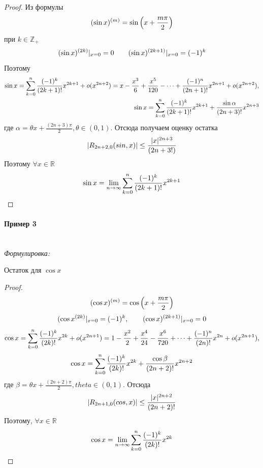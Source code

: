 \documentclass{article}
\let\vanillaparagraph\paragraph
\renewcommand{\paragraph}[1]{\vanillaparagraph{#1}\mbox{}\\}
\begin{document}
\begin{proof}
Из формулы 
\begin{equation}
(\sin{x})^{(m)} = \sin{\left(x + \frac{m\pi} {2}\right)}\notag
\end{equation}
при $k \in \mathbb{Z}_+$
\begin{equation}
(\sin{x})^{(2k)} \arrowvert_{x=0} = 0 \qquad (\sin{x})^{(2k + 1)} \arrowvert_{x=0} = (-1)^k\notag
\end{equation}
Поэтому 
\begin{eqnarray}
\sin{x} = \sum_{k=0}^n \frac{(-1)^k} {(2k+1)!} x^{2k+1} + o(x^{2n+2}) = x - \frac{x^3} {6} + \frac{x^5} {120} - \dots + \frac{(-1)^n} {(2n + 1)!} x^{2n+1} + o(x^{2n+2}),\notag \\
\sin{x} = \sum_{k=0}^n \frac{(-1)^k} {(2k+1)!} x^{2k+1} + \frac {\sin{\alpha}} {(2n+3)!} x^{2n+3}\notag
\end{eqnarray}
где $\alpha = \theta x + \frac{(2n + 3)\pi} {2}, \theta \in (0, 1)$.
Отсюда получаем оценку остатка
\begin{equation}
|R_{2n+2, 0} (sin, x )| \leq \frac{|x|^{2n + 3}} {(2n+3!)} \notag
\end{equation}
Поэтому $\forall x \in \mathbb{R}$
\begin{equation}
\sin{x} = \lim_{n\to\infty}\sum_{k=0}^n \frac{(-1)^k} {(2k+1)!} x^{2k+1}\notag
\end{equation}
\end{proof}

\paragraph{Пример 3}

\textit{Формулировка: }

Остаток для $\cos{x}$

\begin{proof}
\begin{equation}
(\cos{x})^{(m)} = \cos{\left(x + \frac{m\pi} {2}\right)}\notag
\end{equation}
\begin{equation}
(\cos{x}^{(2k)}\arrowvert_{x=0} = (-1)^k, \qquad (\cos{x})^{(2k + 1)} \arrowvert_{x=0} = 0\notag
\end{equation}
\begin{equation}
\cos{x} = \sum_{k=0}^n \frac{(-1)^k} {(2k)!} x^{2k} + o(x^{2n+1}) = 1 - \frac{x^2} {2} + \frac {x^4} {24} - \frac{x^6} {720} + \dots + \frac{(-1)^n} {(2n)!} x^{2n} + o(x^{2n+1}),\notag
\end{equation}
\begin{equation}
\cos{x} = \sum_{k=0}^n \frac{(-1)^k} {(2k)!} x^{2k} + \frac {\cos{\beta}} {(2n+2)!} x^{2n+2}\notag
\end{equation}
где $\beta = \theta x + \frac{(2n+2)\pi} {2}, theta \in (0, 1)$. Отсюда
\begin{equation}
|R_{2n+1, 0} (cos, x)| \leq \frac{|x|^{2n+2}}{(2n+2)!}\notag
\end{equation}
Поэтому, $\forall x \in \mathbb{R}$
\begin{equation}
\cos{x} = \lim_{n \to\infty}\sum_{k=0}^n \frac{(-1)^k} {(2k)!} x^{2k}\notag
\end{equation}
\end{proof}
\end{document}
